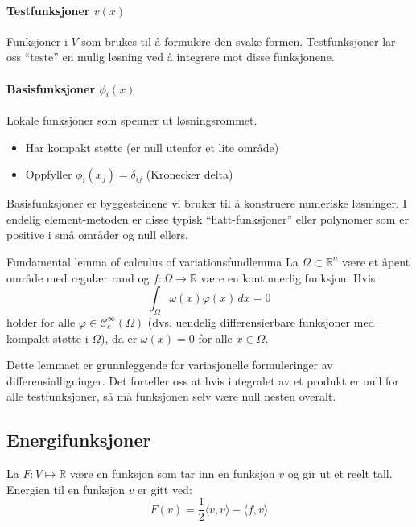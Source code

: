 \documentclass[../main.tex]{subfiles}
\begin{document}
\paragraph{Testfunksjoner \(v(x)\)} Funksjoner i \(V\) som brukes til å formulere den svake formen.
Testfunksjoner lar oss \enquote{teste} en mulig løsning ved å integrere mot disse funksjonene.

\paragraph{Basisfunksjoner \(\phi_i(x)\)} Lokale funksjoner som spenner ut løsningsrommet.
\begin{itemize}
	\item Har kompakt støtte (er null utenfor et lite område)
	\item Oppfyller \(\phi_i(x_j) = \delta_{ij}\) (Kronecker delta)
\end{itemize}

Basisfunksjoner er byggesteinene vi bruker til å konstruere numeriske løsninger. I endelig element-metoden er disse typisk \enquote{hatt-funksjoner} eller polynomer som er positive i små områder og null ellers.

\begin{lemma}{Fundamental lemma of calculus of variations}{fundlemma}
	La $\Omega \subset \mathbb{R}^n$ være et åpent område med regulær rand og $f: \Omega \rightarrow \mathbb{R}$ være en kontinuerlig funksjon.
	Hvis
	\begin{equation}
		\int_{\Omega} \omega(x) \varphi(x) \, dx = 0
	\end{equation}
	holder for alle $\varphi \in \mathcal{C}_c^{\infty}(\Omega)$ (dvs. uendelig differensierbare funksjoner med kompakt støtte i $\Omega$), da er $\omega(x) = 0$ for alle $x \in \Omega$.
\end{lemma}

Dette lemmaet er grunnleggende for variasjonelle formuleringer av differensialligninger. Det forteller oss at hvis integralet av et produkt er null for alle testfunksjoner, så må funksjonen selv være null nesten overalt.

\subsection{Energifunksjoner}
La \(F: V \mapsto \mathbb{R}\) være en funksjon som tar inn en funksjon \(v\) og gir ut et reelt tall. Energien til en funksjon \(v\) er gitt ved:
\[
	F(v) = \frac{1}{2} \langle v, v \rangle - \langle f, v \rangle
\]
\end{document}
